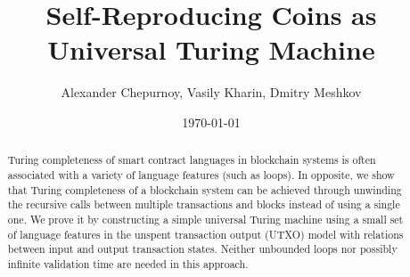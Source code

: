 \documentclass[runningheads]{llncs}
\begin{document}
    \title{Self-Reproducing Coins as Universal Turing Machine}

\author{Alexander Chepurnoy, Vasily Kharin, Dmitry Meshkov}


    \date{\today}
    \maketitle

    \begin{abstract}
        Turing completeness of smart contract languages in blockchain
        systems is often associated with a variety of language features
        (such as loops). 
        In opposite, we show that Turing completeness of a blockchain system can
        be achieved through unwinding the recursive calls between
        multiple transactions and blocks instead of using a single one. We prove 
        it by constructing a simple universal Turing machine using
        a small set of language features in the unspent
        transaction output (UTXO) model with relations between
        input and output transaction states.
        Neither unbounded loops nor possibly infinite validation time are needed in this approach.

    \end{abstract}
\end{document}
